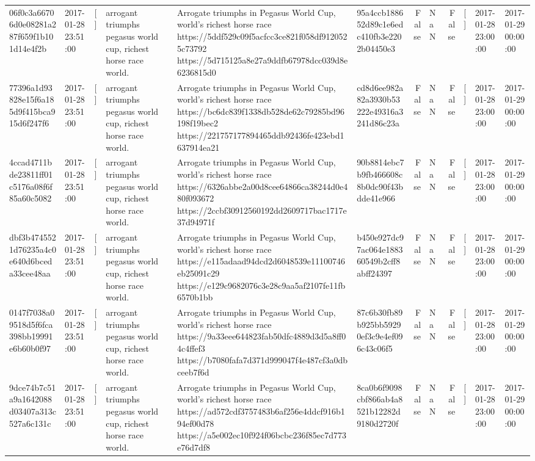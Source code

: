 \begin{tabular}{llllllrlrlll}
06f0c3a66706d0e08281a287f659f1b101d14e4f2b & 2017-01-28 23:51:00 & [] & arrogant triumphs pegasus world cup, richest horse race world. & Arrogate triumphs in Pegasus World Cup, world's richest horse race https://5ddf529c09f5acfcc3ce821f058df9120525c73792 https://5d715125a8e27a9ddfb67978dcc039d8e6236815d0 & 95a4ccb188652d89c1e6edc410fb3e2202b04450e3 & False & NaN & False & [] & 2017-01-28 23:00:00 & 2017-01-29 00:00:00 \\
77396a1d93828e15f6a185d9f415bca915d6f247f6 & 2017-01-28 23:51:00 & [] & arrogant triumphs pegasus world cup, richest horse race world. & Arrogate triumphs in Pegasus World Cup, world's richest horse race https://bc6dc839f1338db528de62c79285bd96198f19bec2 https://221757177894465ddb92436fe423ebd1637914ea21 & cd8d6ee982a82a3930b53222e49316a3241d86c23a & False & NaN & False & [] & 2017-01-28 23:00:00 & 2017-01-29 00:00:00 \\
4ccad4711bde23811ff01c5176a08f6f85a60c5082 & 2017-01-28 23:51:00 & [] & arrogant triumphs pegasus world cup, richest horse race world. & Arrogate triumphs in Pegasus World Cup, world's richest horse race https://6326abbe2a00d8cee64866ca38244d0e480f093672 https://2ccbf30912560192dd2609717bac1717e37d94971f & 90b8814ebc7b9fb466608c8b0dc90f43bdde41e966 & False & NaN & False & [] & 2017-01-28 23:00:00 & 2017-01-29 00:00:00 \\
dbf3b4745521d76235a4c0e640d6bceda33cee48aa & 2017-01-28 23:51:00 & [] & arrogant triumphs pegasus world cup, richest horse race world. & Arrogate triumphs in Pegasus World Cup, world's richest horse race https://e115adaad94dcd2d6048539e11100746eb25091c29 https://e129c9682076c3e28c9aa5af2107fe11fb6570b1bb & b450e927dc97ac064e188360549b2cff8abff24397 & False & NaN & False & [] & 2017-01-28 23:00:00 & 2017-01-29 00:00:00 \\
0147f7038a09518d5f6fca398bb19991e6b60b0f97 & 2017-01-28 23:51:00 & [] & arrogant triumphs pegasus world cup, richest horse race world. & Arrogate triumphs in Pegasus World Cup, world's richest horse race https://9a33eee644823fab50dfc4889d3d5a8ff04c4ffef3 https://b7080fafa7d371d999047f4e487cf3a0dbceeb7f6d & 87c6b30fb89b925bb59290ef3c9e4ef096c43c06f5 & False & NaN & False & [] & 2017-01-28 23:00:00 & 2017-01-29 00:00:00 \\
9dce74b7c51a9a1642088d03407a313c527a6c131c & 2017-01-28 23:51:00 & [] & arrogant triumphs pegasus world cup, richest horse race world. & Arrogate triumphs in Pegasus World Cup, world's richest horse race https://ad572cdf3757483b6af256e4ddcf916b194ef00d78 https://a5e002ec10f924f06bcbc236f85ec7d773e76d7df8 & 8ca0b6f9098cbf866ab4a8521b12282d9180d2720f & False & NaN & False & [] & 2017-01-28 23:00:00 & 2017-01-29 00:00:00 \\

\end{tabular}
